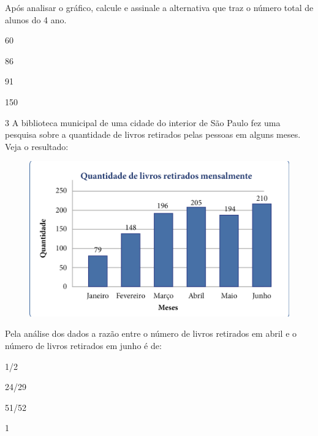 Após analisar o gráfico, calcule e assinale a alternativa que traz o
número total de alunos do 4 ano.

\begin{minipage}{.5\textwidth}
\begin{escolha}
\item
  60
\item
  86
\item
  91
\item
  150
\end{escolha}
\end{minipage}


\pagebreak
\num{3} A biblioteca municipal de uma cidade do interior de São Paulo fez
uma pesquisa sobre a quantidade de livros retirados pelas pessoas em
alguns meses. Veja o resultado:

\begin{figure}[htpb!]
\includegraphics[width=\textwidth]{../ilustracoes/MAT5/SAEB_5ANO_MAT_figura111.png}
\end{figure}

Pela análise dos dados a razão entre o número de livros retirados em
abril e o número de livros retirados em junho é de:

\begin{minipage}{.5\textwidth}
\begin{escolha}
\item
  1/2
\item
  24/29
\item
  51/52
\item
  1
\end{escolha}
\end{minipage}


